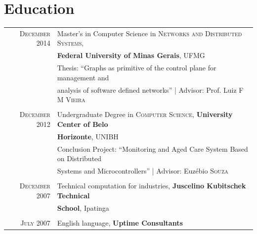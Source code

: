 \documentclass[a4paper,10pt]{article} %
\begin{document}
\section{Education}

\begin{tabular}{rl}
\textsc{December} 2014 & Master's in Computer Science in
\textsc{Networks and Distributed Systems}, \\
& \textbf{Federal University of Minas Gerais}, UFMG \\
& Thesis: ``Graphs as primitive of the control plane for management and
\\ & analysis of software defined networks''
| \small Advisor: Prof. Luiz \textsc{F M Vieira} \\
&\\


\textsc{December} 2012& Undergraduate Degree in
\textsc{}\textsc{Computer Science},
\normalsize\textbf{ University Center of Belo}
\\ & \textbf{Horizonte}, UNIBH \\
& Conclusion Project: ``Monitoring and Aged Care System Based on
Distributed
\\ & Systems and Microcontrollers''
| \small Advisor: Euzébio \textsc{Souza} \\
&\\


\textsc{December} 2007 &Technical computation for industries,
\textbf{Juscelino Kubitschek Technical}
\\ & \textbf{School}, Ipatinga \\
&\\


\textsc{July} 2007 & English language, \textbf{Uptime Consultants}
\end{tabular}
\end{document}
